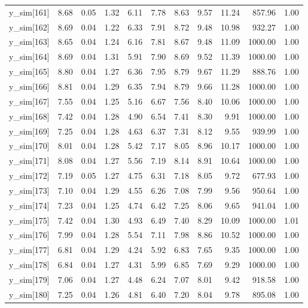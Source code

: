 \begin{table}[ht]
\begin{tabular}{rrrrrrrrrrr}
  y\_sim[161] & 8.68 & 0.05 & 1.32 & 6.11 & 7.78 & 8.63 & 9.57 & 11.24 & 857.96 & 1.00 \\ 
  y\_sim[162] & 8.69 & 0.04 & 1.22 & 6.33 & 7.91 & 8.72 & 9.48 & 10.98 & 932.27 & 1.00 \\ 
  y\_sim[163] & 8.65 & 0.04 & 1.24 & 6.16 & 7.81 & 8.67 & 9.48 & 11.09 & 1000.00 & 1.00 \\ 
  y\_sim[164] & 8.69 & 0.04 & 1.31 & 5.91 & 7.90 & 8.69 & 9.52 & 11.39 & 1000.00 & 1.00 \\ 
  y\_sim[165] & 8.80 & 0.04 & 1.27 & 6.36 & 7.95 & 8.79 & 9.67 & 11.29 & 888.76 & 1.00 \\ 
  y\_sim[166] & 8.81 & 0.04 & 1.29 & 6.35 & 7.94 & 8.79 & 9.66 & 11.28 & 1000.00 & 1.00 \\ 
  y\_sim[167] & 7.55 & 0.04 & 1.25 & 5.16 & 6.67 & 7.56 & 8.40 & 10.06 & 1000.00 & 1.00 \\ 
  y\_sim[168] & 7.42 & 0.04 & 1.28 & 4.90 & 6.54 & 7.41 & 8.30 & 9.91 & 1000.00 & 1.00 \\ 
  y\_sim[169] & 7.25 & 0.04 & 1.28 & 4.63 & 6.37 & 7.31 & 8.12 & 9.55 & 939.99 & 1.00 \\ 
  y\_sim[170] & 8.01 & 0.04 & 1.28 & 5.42 & 7.17 & 8.05 & 8.96 & 10.17 & 1000.00 & 1.00 \\ 
  y\_sim[171] & 8.08 & 0.04 & 1.27 & 5.56 & 7.19 & 8.14 & 8.91 & 10.64 & 1000.00 & 1.00 \\ 
  y\_sim[172] & 7.19 & 0.05 & 1.27 & 4.75 & 6.31 & 7.18 & 8.05 & 9.72 & 677.93 & 1.00 \\ 
  y\_sim[173] & 7.10 & 0.04 & 1.29 & 4.55 & 6.26 & 7.08 & 7.99 & 9.56 & 950.64 & 1.00 \\ 
  y\_sim[174] & 7.23 & 0.04 & 1.25 & 4.74 & 6.42 & 7.25 & 8.06 & 9.65 & 941.04 & 1.00 \\ 
  y\_sim[175] & 7.42 & 0.04 & 1.30 & 4.93 & 6.49 & 7.40 & 8.29 & 10.09 & 1000.00 & 1.01 \\ 
  y\_sim[176] & 7.99 & 0.04 & 1.28 & 5.54 & 7.11 & 7.98 & 8.86 & 10.52 & 1000.00 & 1.00 \\ 
  y\_sim[177] & 6.81 & 0.04 & 1.29 & 4.24 & 5.92 & 6.83 & 7.65 & 9.35 & 1000.00 & 1.00 \\ 
  y\_sim[178] & 6.84 & 0.04 & 1.27 & 4.31 & 5.99 & 6.85 & 7.69 & 9.29 & 1000.00 & 1.00 \\ 
  y\_sim[179] & 7.06 & 0.04 & 1.27 & 4.48 & 6.24 & 7.07 & 8.01 & 9.42 & 918.58 & 1.00 \\ 
  y\_sim[180] & 7.25 & 0.04 & 1.26 & 4.81 & 6.40 & 7.20 & 8.04 & 9.78 & 895.08 & 1.00 \\ 

\end{tabular}
\end{table}
